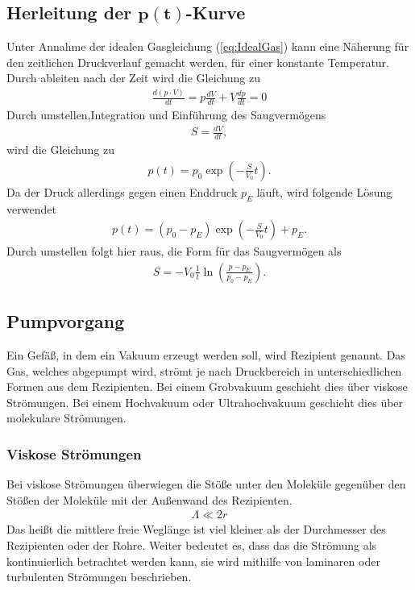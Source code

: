 \subsection[Herleitung der $p(t)$-Kurve]{Herleitung der $\mathbf{p(t)}$-Kurve}
Unter Annahme der idealen Gasgleichung (\ref{eq:IdealGas})
kann eine Näherung für den zeitlichen Druckverlauf gemacht werden, für einer konstante Temperatur.
Durch ableiten nach der Zeit wird die Gleichung zu
\begin{align}
\frac{d\left(p\cdot V \right)}{dt}=p\frac{dV}{dt}+V\frac{dp}{dt}=0
\end{align}
Durch umstellen,Integration und Einführung des Saugvermögens 
\begin{align}
S=\frac{dV}{dt},
\end{align}
wird die Gleichung zu
\begin{align}
p(t) = p_0 \exp\left(-\frac{S}{V_0}t\right).
\end{align}
Da der Druck allerdings gegen einen Enddruck $p_E$ läuft, wird folgende Lösung verwendet
\begin{align}
p(t) = \left( p_0-p_E \right) \exp\left(-\frac{S}{V_0}t\right) + p_E.
\label{eq:Evakuierungskurve}
\end{align}
Durch umstellen folgt hier raus, die Form für das Saugvermögen als
\begin{align}
S=-V_0\frac{1}{t}\ln \left( \frac{p-p_E}{p_0-p_E} \right).
\label{eq:Saugvermoegen_Evakuierungskurve}
\end{align}
\subsection{Pumpvorgang}
Ein Gefäß, in dem ein Vakuum erzeugt werden soll, wird Rezipient genannt. Das Gas, welches abgepumpt wird, strömt je nach Druckbereich in unterschiedlichen Formen aus dem Rezipienten. Bei einem Grobvakuum geschieht dies über viskose Strömungen.
Bei einem Hochvakuum oder Ultrahochvakuum geschieht dies über molekulare Strömungen.
\subsubsection{Viskose Strömungen}
Bei viskose Strömungen überwiegen die Stöße unter den Moleküle gegenüber den Stößen der Moleküle mit der Außenwand des Rezipienten.
\begin{align}
 \Lambda \ll 2 r
\end{align}
Das heißt die mittlere freie Weglänge ist viel kleiner als der Durchmesser des Rezipienten oder der Rohre. Weiter bedeutet es, dass das die Strömung als kontinuierlich betrachtet werden kann, sie wird mithilfe von laminaren oder turbulenten Strömungen beschrieben.
